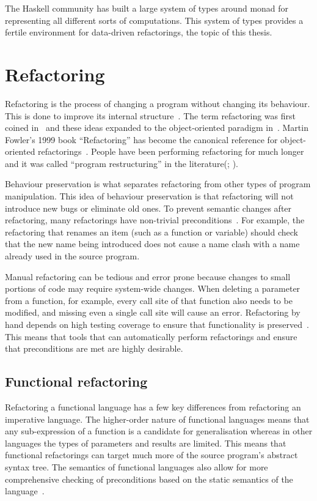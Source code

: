 The Haskell community has built a large system of types around monad for representing all different sorts of computations. This system of types provides a fertile environment for data-driven refactorings, the topic of this thesis.

\section{Refactoring} 
Refactoring is the process of changing a program without changing its behaviour. This is done to improve its internal structure~\citep{fowler}. The term refactoring was first coined in~\citep{programRestructuring} and these ideas expanded to the object-oriented paradigm in~\citep{refactOOFrameworks}. Martin Fowler's 1999 book ``Refactoring'' has become the canonical reference for object-oriented refactorings~\citep{fowler}. People have been performing refactoring for much longer and it was called ``program restructuring'' in the literature(\cite{highSpeedRestructuring}; \cite{performanceRestructuring}). 

Behaviour preservation is what separates refactoring from other types of program manipulation. This idea of behaviour preservation is that refactoring will not introduce new bugs or eliminate old ones. To prevent semantic changes after refactoring, many refactorings have non-trivial preconditions~\citep{mens2002formalising}. For example, the refactoring that renames an item (such as a function or variable) should check that the new name being introduced does not cause a name clash with a name already used in the source program.

Manual refactoring can be tedious and error prone because changes to small portions of code may require system-wide changes. When deleting a parameter from a function, for example, every call site of that function also needs to be modified, and missing even a single call site will cause an error. Refactoring by hand depends on high testing coverage to ensure that functionality is preserved~\citep{fowler}. This means that tools that can automatically perform refactorings and ensure that preconditions are met are highly desirable.

\subsection{Functional refactoring}

Refactoring a functional language has a few key differences from refactoring an imperative language. The higher-order nature of functional languages means that any sub-expression of a function is a candidate for generalisation whereas in other languages the types of parameters and results are limited. This means that functional refactorings can target much more of the source program's abstract syntax tree. The semantics of functional languages also allow for more comprehensive checking of preconditions based on the static semantics of the language~\citep{refacTools}.

